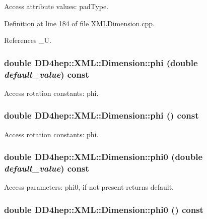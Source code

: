 Access attribute values: padType. 

Definition at line 184 of file XMLDimension.cpp.

References \_\-U.\hypertarget{struct_d_d4hep_1_1_x_m_l_1_1_dimension_aa106c5202afcad00c7b5e79f4228dcd1}{
\subsubsection[{phi}]{\setlength{\rightskip}{0pt plus 5cm}double DD4hep::XML::Dimension::phi (double {\em default\_\-value}) const}}
\label{struct_d_d4hep_1_1_x_m_l_1_1_dimension_aa106c5202afcad00c7b5e79f4228dcd1}


Access rotation constants: phi. \hypertarget{struct_d_d4hep_1_1_x_m_l_1_1_dimension_acb10ddbcff35704b49b4f03a7eef4e37}{
\subsubsection[{phi}]{\setlength{\rightskip}{0pt plus 5cm}double DD4hep::XML::Dimension::phi () const}}
\label{struct_d_d4hep_1_1_x_m_l_1_1_dimension_acb10ddbcff35704b49b4f03a7eef4e37}


Access rotation constants: phi. \hypertarget{struct_d_d4hep_1_1_x_m_l_1_1_dimension_ad74bd67752b128af2001a6069777b92f}{
\subsubsection[{phi0}]{\setlength{\rightskip}{0pt plus 5cm}double DD4hep::XML::Dimension::phi0 (double {\em default\_\-value}) const}}
\label{struct_d_d4hep_1_1_x_m_l_1_1_dimension_ad74bd67752b128af2001a6069777b92f}


Access parameters: phi0, if not present returns default. \hypertarget{struct_d_d4hep_1_1_x_m_l_1_1_dimension_afeace187ac0a04a87394ee5434fb12ba}{
\subsubsection[{phi0}]{\setlength{\rightskip}{0pt plus 5cm}double DD4hep::XML::Dimension::phi0 () const}}
\label{struct_d_d4hep_1_1_x_m_l_1_1_dimension_afeace187ac0a04a87394ee5434fb12ba}



